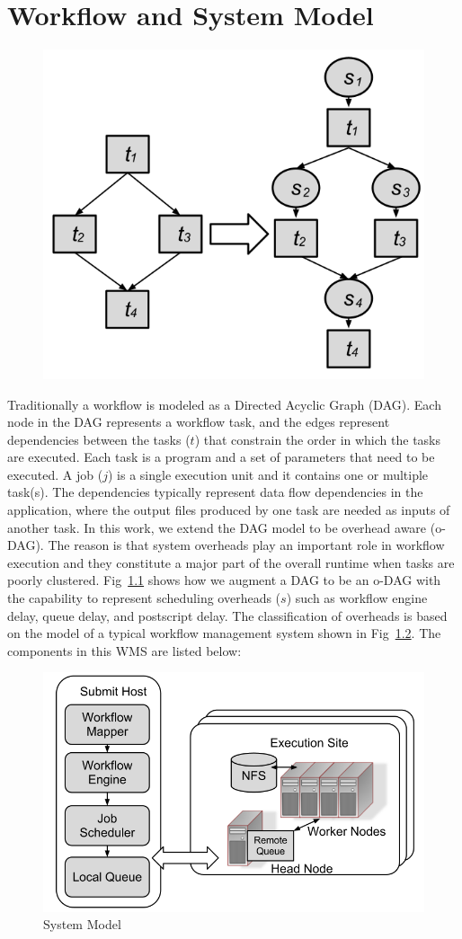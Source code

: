 \chapter{Workflow and System Model}

\begin{figure}[h!]
\includegraphics[width=0.5\linewidth]{figures/introduction/odag.png}
\centering
  \label{fig:intro_odag}
\end{figure}

Traditionally a workflow is modeled as a Directed Acyclic Graph (DAG). Each node in the DAG represents a workflow task, and the edges represent dependencies between the tasks ($t$) that constrain the order in which the tasks are executed. Each task is a program and a set of parameters that need to be executed. A job ($j$) is a single execution unit and it contains one or multiple task(s). The dependencies typically represent data flow dependencies in the application, where the output files produced by one task are needed as inputs of another task. In this work, we extend the DAG model to be overhead aware (o-DAG). The reason is that system overheads play an important role in workflow execution and they constitute a major part of the overall runtime when tasks are poorly clustered. Fig~\ref{fig:intro_odag} shows how we augment a DAG to be an o-DAG with the capability to represent scheduling overheads ($s$) such as workflow engine delay, queue delay, and postscript delay. The classification of overheads is based on the model of a typical workflow management system shown in Fig~\ref{fig:intro_system}. The components in this WMS are listed below: 

\begin{figure}[h!]
\centering
  \includegraphics[width=0.6\linewidth]{figures/introduction/system.png}

  \caption{System Model}
  \label{fig:intro_system}
\end{figure}



